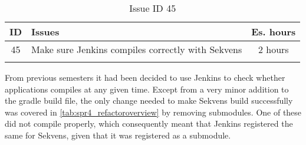 \clearpage
\begin{longtable} { | c | p{12cm} | c | } 
\hline
	ID 	&	Issues	&		 Es. hours \\\hline
	45	&	Make sure Jenkins compiles correctly with Sekvens	&	2 hours	\\\hline
\caption{Issue ID 45}
\label{tab:spr4_jenkins}
\end{longtable}

From previous semesters it had been decided to use Jenkins to check whether applications compiles at any given time. Except from a very minor addition to the gradle build file, the only change needed to make Sekvens build successfully was covered in \ref{tab:spr4_refactoroverview} by removing submodules. One of these did not compile properly, which consequently meant that Jenkins registered the same for Sekvens, given that it was registered as a submodule.